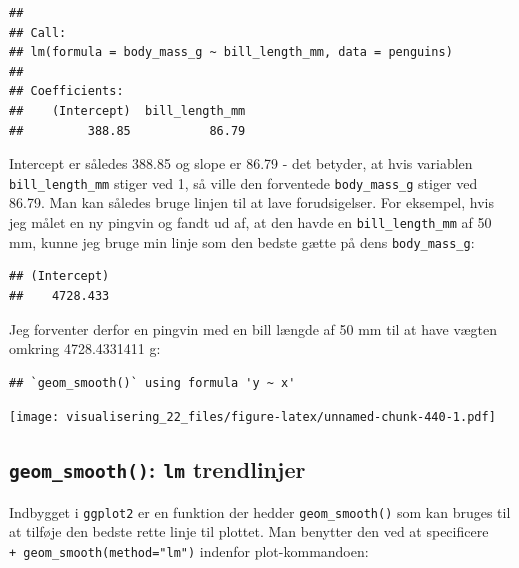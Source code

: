 \documentclass[
]{book}
\newenvironment{Shaded}{\begin{snugshade}}{\end{snugshade}}
\newcommand{\DecValTok}[1]{\textcolor[rgb]{0.00,0.00,0.81}{#1}}
\newcommand{\NormalTok}[1]{#1}
\newcommand{\OtherTok}[1]{\textcolor[rgb]{0.56,0.35,0.01}{#1}}
\newcommand{\SpecialCharTok}[1]{\textcolor[rgb]{0.00,0.00,0.00}{#1}}
\begin{document}
\begin{verbatim}
## 
## Call:
## lm(formula = body_mass_g ~ bill_length_mm, data = penguins)
## 
## Coefficients:
##    (Intercept)  bill_length_mm  
##         388.85           86.79
\end{verbatim}

Intercept er således 388.85 og slope er 86.79 - det betyder, at hvis variablen \texttt{bill\_length\_mm} stiger ved 1, så ville den forventede \texttt{body\_mass\_g} stiger ved 86.79. Man kan således bruge linjen til at lave forudsigelser. For eksempel, hvis jeg målet en ny pingvin og fandt ud af, at den havde en \texttt{bill\_length\_mm} af 50 mm, kunne jeg bruge min linje som den bedste gætte på dens \texttt{body\_mass\_g}:

\begin{Shaded}
\end{Shaded}

\begin{verbatim}
## (Intercept) 
##    4728.433
\end{verbatim}

Jeg forventer derfor en pingvin med en bill længde af 50 mm til at have vægten omkring 4728.4331411 g:

\begin{verbatim}
## `geom_smooth()` using formula 'y ~ x'
\end{verbatim}

\texttt{[image: visualisering\_22\_files/figure-latex/unnamed-chunk-440-1.pdf]}

\hypertarget{geom_smooth-lm-trendlinjer}{%
\subsection{\texorpdfstring{\texttt{geom\_smooth()}: \texttt{lm} trendlinjer}{geom\_smooth(): lm trendlinjer}}\label{geom_smooth-lm-trendlinjer}}

Indbygget i \texttt{ggplot2} er en funktion der hedder \texttt{geom\_smooth()} som kan bruges til at tilføje den bedste rette linje til plottet. Man benytter den ved at specificere \texttt{+\ geom\_smooth(method="lm")} indenfor plot-kommandoen:
\end{document}
